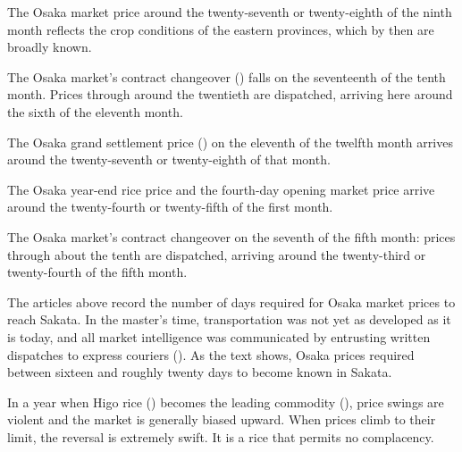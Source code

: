 

\begin{sokyubox}
{\small\itshape\color{sokyubar} }

\medskip
The Osaka market price around the twenty-seventh or twenty-eighth of the
ninth month reflects the crop conditions of the eastern provinces, which
by then are broadly known.

The Osaka market's contract changeover () falls
on the seventeenth of the tenth month. Prices through around the twentieth
are dispatched, arriving here around the sixth of the eleventh month.

The Osaka grand settlement price () on the
eleventh of the twelfth month arrives around the twenty-seventh or
twenty-eighth of that month.

The Osaka year-end rice price and the fourth-day opening market price
arrive around the twenty-fourth or twenty-fifth of the first month.

The Osaka market's contract changeover on the seventh of the fifth
month: prices through about the tenth are dispatched, arriving around the
twenty-third or twenty-fourth of the fifth month.
\end{sokyubox}

\commentary
The articles above record the number of days required for Osaka market
prices to reach Sakata. In the master's time, transportation was not yet
as developed as it is today, and all market intelligence was communicated
by entrusting written dispatches to express couriers ().
As the text shows, Osaka prices required between sixteen and roughly
twenty days to become known in Sakata.


\begin{sokyubox}
{\small\itshape\color{sokyubar} }

\medskip
In a year when Higo rice () becomes the leading
commodity (), price swings are violent and the market
is generally biased upward. When prices climb to their limit, the reversal
is extremely swift. It is a rice that permits no complacency.
\end{sokyubox}

